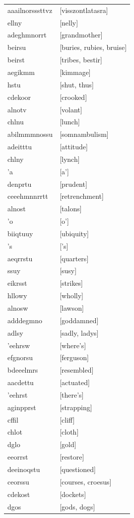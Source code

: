 \documentclass{article}
\begin{document}
\begin{tabular}{ll}
aaailnorsssttvz & [visszontlatasra] \\
ellny & [nelly] \\
adeghmnorrt & [grandmother] \\
beirsu & [buries, rubies, bruise] \\
beirst & [tribes, bestir] \\
aegikmm & [kimmage] \\
hstu & [shut, thus] \\
cdekoor & [crooked] \\
alnotv & [volant] \\
chlnu & [lunch] \\
abilmmmnossu & [somnambulism] \\
adeitttu & [attitude] \\
chlny & [lynch] \\
'a & [a'] \\
denprtu & [prudent] \\
ceeehmnnrrtt & [retrenchment] \\
alnost & [talons] \\
'o & [o'] \\
biiqtuuy & [ubiquity] \\
's & ['s] \\
aeqrrstu & [quarters] \\
ssuy & [susy] \\
eikrsst & [strikes] \\
hllowy & [wholly] \\
alnosw & [lawson] \\
adddegmno & [goddamned] \\
adlsy & [sadly, ladys] \\
'eehrsw & [where's] \\
efgnorsu & [ferguson] \\
bdeeelmrs & [resembled] \\
aacdettu & [actuated] \\
'eehrst & [there's] \\
aginpprst & [strapping] \\
cffil & [cliff] \\
chlot & [cloth] \\
dglo & [gold] \\
eeorrst & [restore] \\
deeinoqstu & [questioned] \\
ceorssu & [courses, croesus] \\
cdekost & [dockets] \\
dgos & [gods, dogs] \\

\end{tabular}
\end{document}
